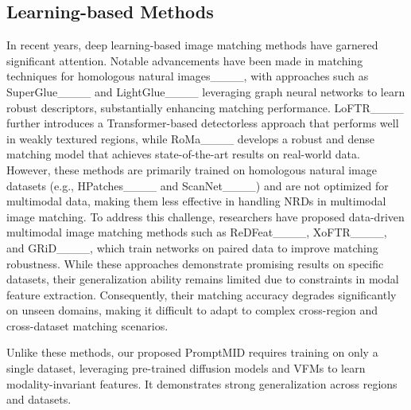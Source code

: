 \subsection{Learning-based Methods}
In recent years, deep learning-based image matching methods have garnered significant attention. Notable advancements have been made in matching techniques for homologous natural images____, with approaches such as SuperGlue____ and LightGlue____ leveraging graph neural networks to learn robust descriptors, substantially enhancing matching performance. LoFTR____ further introduces a Transformer-based detectorless approach that performs well in weakly textured regions, while RoMa____ develops a robust and dense matching model that achieves state-of-the-art results on real-world data. However, these methods are primarily trained on homologous natural image datasets (e.g., HPatches____ and ScanNet____) and are not optimized for multimodal data, making them less effective in handling NRDs in multimodal image matching. To address this challenge, researchers have proposed data-driven multimodal image matching methods such as ReDFeat____, XoFTR____, and GRiD____, which train networks on paired data to improve matching robustness. While these approaches demonstrate promising results on specific datasets, their generalization ability remains limited due to constraints in modal feature extraction. Consequently, their matching accuracy degrades significantly on unseen domains, making it difficult to adapt to complex cross-region and cross-dataset matching scenarios.

Unlike these methods, our proposed PromptMID requires training on only a single dataset, leveraging pre-trained diffusion models and VFMs to learn modality-invariant features. It demonstrates strong generalization across regions and datasets.

